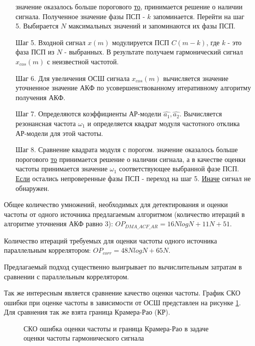 \begin{itemize}
	  значение оказалось больше порогового {\underline{то}},
		принимается решение о наличии сигнала. Полученное значение фазы ПСП  - ${k}$ запоминается.
		Перейти на шаг 5.
		Выбирается ${N}$ максимальных значений и запоминаются их фазы ПСП.
\item[Шаг 5.] Входной сигнал ${x(m)}$ модулируется ПСП ${C(m-k)}$, где ${k}$ - это фаза ПСП из ${N}$ - выбранных. В результате получаем гармонический
	сигнал ${x_{cos}(m)}$ с неизвестной частотой.
\item[Шаг 6.] Для увеличения ОСШ сигнала ${x_{cos}(m)}$ вычисляется значение уточненное значение АКФ
	по усовершенствованному итеративному алгоритму получения АКФ.
\item[Шаг 7.] Определяются коэффициенты АР-модели ${\hat{a_1}, \hat{a_2}}$.
	Вычисляется резонансная частота ${\omega_1}$ и определяется квадрат модуля частотного отклика АР-модели для этой частоты. 
\item[Шаг 8.]
	Сравнение квадрата модуля с порогом.
          значение оказалось больше порогового {\underline{то}} 
                принимается решение о наличии сигнала, а в качестве оценки
                частоты принимается значение ${\omega_1}$ соответствующее выбранной фазе ПСП. 
		\subsubitem\underline{Если} остались непроверенные фазы ПСП - переход на шаг 5.
		\subsubitem\underline{Иначе} сигнал не обнаружен.
\end{itemize}

Общее количество умножений, необходимых для детектирования и оценки частоты от одного источника предлагаемым
алгоритмом (количество итераций в алгоритме уточнения АКФ равно 3): ${OP_{DMA\_ACF\_AR} = 16NlogN + 11N + 51}$.

Количество итераций требуемых для оценки частоты одного источника параллельным коррелятором:
${OP_{corr} = 48NlogN + 65N}$.

Предлагаемый подход существенно выигрывает по вычислительным затратам в сравнении с параллельным коррелятором.

Так же интересным является сравнение качество оценки частоты. График СКО ошибки при оценке частоты в зависимости
от ОСШ представлен на рисунке \ref{pic:crlb_vs_snr}. Для сравнения так же взята граница Крамера-Рао (КР).
\begin{figure}[H]
\center{}
	\caption{СКО ошибка оценки частоты и граница Крамера-Рао в задаче оценки частоты гармонического сигнала}
	\label{pic:crlb_vs_snr}
\end{figure}
